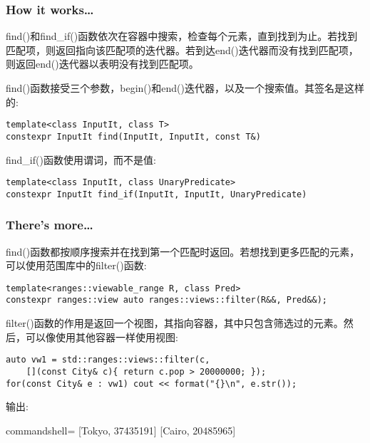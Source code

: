 \subsubsection{How it works…}

find()和find\_if()函数依次在容器中搜索，检查每个元素，直到找到为止。若找到匹配项，则返回指向该匹配项的迭代器。若到达end()迭代器而没有找到匹配项，则返回end()迭代器以表明没有找到匹配项。

find()函数接受三个参数，begin()和end()迭代器，以及一个搜索值。其签名是这样的:

\begin{lstlisting}[style=styleCXX]
template<class InputIt, class T>
constexpr InputIt find(InputIt, InputIt, const T&)
\end{lstlisting}

find\_if()函数使用谓词，而不是值:

\begin{lstlisting}[style=styleCXX]
template<class InputIt, class UnaryPredicate>
constexpr InputIt find_if(InputIt, InputIt, UnaryPredicate)
\end{lstlisting}


\subsubsection{There's more…}

find()函数都按顺序搜索并在找到第一个匹配时返回。若想找到更多匹配的元素，可以使用范围库中的filter()函数:

\begin{lstlisting}[style=styleCXX]
template<ranges::viewable_range R, class Pred>
constexpr ranges::view auto ranges::views::filter(R&&, Pred&&);
\end{lstlisting}

filter()函数的作用是返回一个视图，其指向容器，其中只包含筛选过的元素。然后，可以像使用其他容器一样使用视图:

\begin{lstlisting}[style=styleCXX]
auto vw1 = std::ranges::views::filter(c,
	[](const City& c){ return c.pop > 20000000; });
for(const City& e : vw1) cout << format("{}\n", e.str());
\end{lstlisting}

输出:

\begin{tcblisting}{commandshell={}}
[Tokyo, 37435191]
[Cairo, 20485965]
\end{tcblisting}
